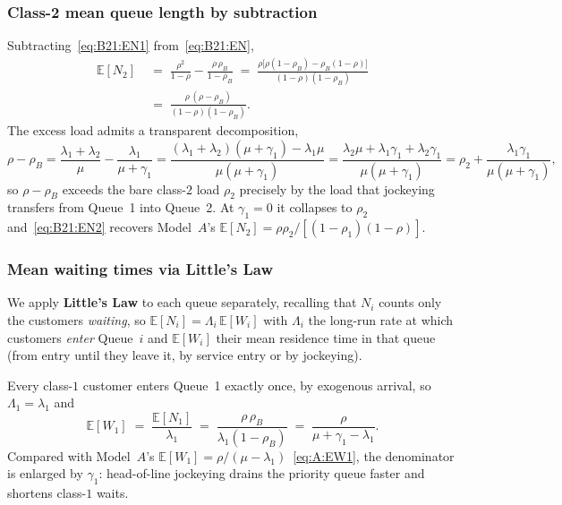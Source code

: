 \subsubsection{Class-2 mean queue length by subtraction}

Subtracting~\eqref{eq:B21:EN1} from~\eqref{eq:B21:EN},
\begin{equation}
    \begin{split}
        \mathbb{E}[N_2]
        &\;=\; \frac{\rho^2}{1-\rho} - \frac{\rho\,\rho_B}{1-\rho_B}
        \;=\; \frac{\rho\bigl[\rho(1-\rho_B)-\rho_B(1-\rho)\bigr]}{(1-\rho)(1-\rho_B)} \\[4pt]
        &\;=\; \frac{\rho\,(\rho-\rho_B)}{(1-\rho)(1-\rho_B)}.
    \end{split}
    \label{eq:B21:EN2}
\end{equation}
The excess load admits a transparent decomposition,
\begin{equation*}
    \rho-\rho_B
    = \frac{\lambda_1+\lambda_2}{\mu} - \frac{\lambda_1}{\mu+\gamma_1}
    = \frac{(\lambda_1+\lambda_2)(\mu+\gamma_1)-\lambda_1\mu}{\mu(\mu+\gamma_1)}
    = \frac{\lambda_2\mu+\lambda_1\gamma_1+\lambda_2\gamma_1}{\mu(\mu+\gamma_1)}
    = \rho_2 + \frac{\lambda_1\gamma_1}{\mu(\mu+\gamma_1)},
\end{equation*}
so $\rho-\rho_B$ exceeds the bare class-$2$ load $\rho_2$ precisely by the load that
jockeying transfers from Queue~1 into Queue~2. At $\gamma_1=0$ it collapses to $\rho_2$
and~\eqref{eq:B21:EN2} recovers Model~$A$'s
$\mathbb{E}[N_2]=\rho\rho_2/[(1-\rho_1)(1-\rho)]$.

\subsubsection{Mean waiting times via Little's Law}

We apply \textbf{Little's Law} to each queue separately, recalling that $N_i$ counts only
the customers \emph{waiting}, so $\mathbb{E}[N_i]=\Lambda_i\,\mathbb{E}[W_i]$ with
$\Lambda_i$ the long-run rate at which customers \emph{enter} Queue~$i$ and $\mathbb{E}[W_i]$
their mean residence time in that queue (from entry until they leave it, by service entry or
by jockeying).

Every class-$1$ customer enters Queue~1 exactly once, by exogenous arrival, so
$\Lambda_1=\lambda_1$ and
\begin{equation}
    \mathbb{E}[W_1] \;=\; \frac{\mathbb{E}[N_1]}{\lambda_1}
    \;=\; \frac{\rho\,\rho_B}{\lambda_1(1-\rho_B)}
    \;=\; \frac{\rho}{\mu+\gamma_1-\lambda_1}.
    \label{eq:B21:EW1}
\end{equation}
Compared with Model~$A$'s $\mathbb{E}[W_1]=\rho/(\mu-\lambda_1)$~\eqref{eq:A:EW1}, the
denominator is enlarged by $\gamma_1$: head-of-line jockeying drains the priority queue
faster and shortens class-$1$ waits.

